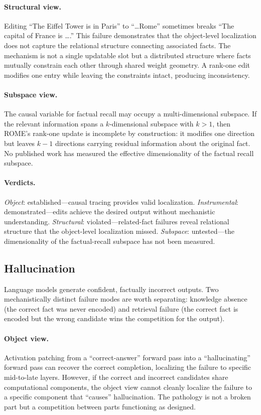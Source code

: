 \documentclass{article}
\begin{document}
\paragraph{Structural view.}
Editing ``The Eiffel Tower is in Paris'' to ``\ldots Rome'' sometimes
breaks ``The capital of France is \ldots.'' This failure demonstrates
that the object-level localization does not capture the relational
structure connecting associated facts. The mechanism is not a single
updatable slot but a distributed structure where facts mutually constrain
each other through shared weight geometry. A rank-one edit modifies one
entry while leaving the constraints intact, producing inconsistency.

\paragraph{Subspace view.}
The causal variable for factual recall may occupy a multi-dimensional
subspace. If the relevant information spans a $k$-dimensional subspace
with $k > 1$, then ROME's rank-one update is incomplete by construction:
it modifies one direction but leaves $k - 1$ directions carrying residual
information about the original fact. No published work has measured the
effective dimensionality of the factual recall subspace.

\paragraph{Verdicts.}
\emph{Object}: established---causal tracing provides valid localization.
\emph{Instrumental}: demonstrated---edits achieve the desired output
without mechanistic understanding.
\emph{Structural}: violated---related-fact failures reveal relational
structure that the object-level localization missed.
\emph{Subspace}: untested---the dimensionality of the factual-recall
subspace has not been measured.


\subsection{Hallucination}\label{app:cs_hallucination}

Language models generate confident, factually incorrect outputs. Two
mechanistically distinct failure modes are worth separating: knowledge
absence (the correct fact was never encoded) and retrieval failure (the
correct fact is encoded but the wrong candidate wins the competition for
the output).

\paragraph{Object view.}
Activation patching from a ``correct-answer'' forward pass into a
``hallucinating'' forward pass can recover the correct completion,
localizing the failure to specific mid-to-late layers. However, if the
correct and incorrect candidates share computational components, the
object view cannot cleanly localize the failure to a specific component
that ``causes'' hallucination. The pathology is not a broken part but a
competition between parts functioning as designed.
\end{document}
